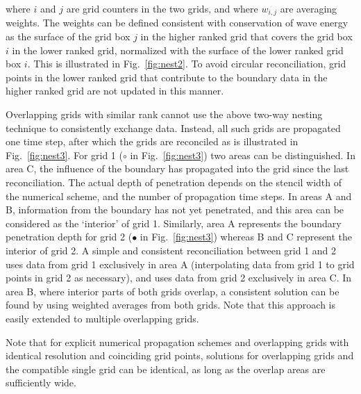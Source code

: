 \noindent
where $i$ and $j$ are grid counters in the two grids, and where $w_{i,j}$ are
averaging weights. The weights can be defined consistent with conservation of
wave energy as the surface of the grid box $j$ in the higher ranked grid that
covers the grid box $i$ in the lower ranked grid, normalized with the surface
of the lower ranked grid box $i$. This is illustrated in Fig.~\ref{fig:nest2}.
To avoid circular reconciliation, grid points in the lower ranked grid that
contribute to the boundary data in the higher ranked grid are not updated in
this manner.



Overlapping grids with similar rank cannot use the above two-way nesting
technique to consistently exchange data. Instead, all such grids are
propagated one time step, after which the grids are reconciled as is
illustrated in Fig.~\ref{fig:nest3}. For grid 1 ($\circ$ in
Fig.~\ref{fig:nest3}) two areas can be distinguished. In area C, the influence
of the boundary has propagated into the grid since the last
reconciliation. The actual depth of penetration depends on the stencil width
of the numerical scheme, and the number of propagation time steps.  In areas A
and B, information from the boundary has not yet penetrated, and this area can
be considered as the `interior' of grid 1.  Similarly, area A represents the
boundary penetration depth for grid 2 ($\bullet$ in Fig.~\ref{fig:nest3})
whereas B and C represent the interior of grid 2.  A simple and consistent
reconciliation between grid 1 and 2 uses data from grid 1 exclusively in area
A (interpolating data from grid 1 to grid points in grid 2 as necessary), and
uses data from grid 2 exclusively in area C. In area B, where interior parts
of both grids overlap, a consistent solution can be found by using weighted
averages from both grids. Note that this approach is easily extended to
multiple overlapping grids.

Note that for explicit numerical propagation schemes and overlapping grids with
identical resolution and coinciding grid points, solutions for overlapping
grids and the compatible single grid can be identical, as long as the overlap
areas are sufficiently wide.


